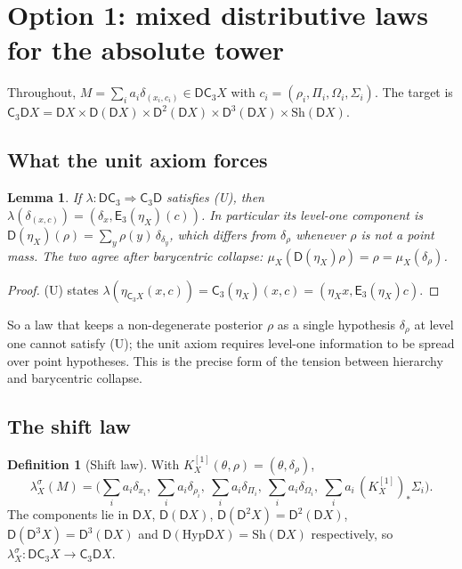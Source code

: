 \documentclass[11pt]{article}
\newtheorem{lemma}[theorem]{Lemma}
\theoremstyle{definition}
\newtheorem{definition}[theorem]{Definition}
\theoremstyle{remark}
\newcommand{\D}{\mathsf{D}}
\newcommand{\Hyp}{\mathrm{Hyp}}
\newcommand{\Sh}{\mathrm{Sh}}
\newcommand{\C}{\mathsf{C}}
\newcommand{\E}{\mathsf{E}}
\newcommand{\ls}{\lambda^{\sigma}}
\begin{document}
\section{Option 1: mixed distributive laws for the absolute tower}\label{sec:laws}

Throughout, $M=\sum_ia_i\delta_{(x_i,c_i)}\in\D\C_3X$ with $c_i=(\rho_i,\Pi_i,\Omega_i,\Sigma_i)$.
The target is $\C_3\D X=\D X\times\D(\D X)\times\D^2(\D X)\times\D^3(\D X)\times\Sh(\D X)$.

\subsection{What the unit axiom forces}

\begin{lemma}\label{lem:unit-forces}
If $\lambda\colon\D\C_3\Rightarrow\C_3\D$ satisfies (U), then
$\lambda(\delta_{(x,c)})=(\delta_x,\E_3(\eta_X)(c))$. In particular its level-one component is
$\D(\eta_X)(\rho)=\sum_y\rho(y)\,\delta_{\delta_y}$, which differs from $\delta_\rho$ whenever $\rho$ is
not a point mass. The two agree after barycentric collapse: $\mu_X(\D(\eta_X)\rho)=\rho=\mu_X(\delta_\rho)$.
\end{lemma}
\begin{proof}
(U) states $\lambda(\eta_{\C_3X}(x,c))=\C_3(\eta_X)(x,c)=(\eta_Xx,\E_3(\eta_X)c)$.
\end{proof}

So a law that keeps a non-degenerate posterior $\rho$ as a single hypothesis $\delta_\rho$ at level one
cannot satisfy (U); the unit axiom requires level-one information to be spread over point
hypotheses. This is the precise form of the tension between hierarchy and barycentric collapse.

\subsection{The shift law}

\begin{definition}[Shift law]
With $K^{[1]}_X(\theta,\rho)=(\theta,\delta_\rho)$,
\[
\ls_X(M)=\Big(\sum_ia_i\delta_{x_i},\ \sum_ia_i\delta_{\rho_i},\ \sum_ia_i\delta_{\Pi_i},\
\sum_ia_i\delta_{\Omega_i},\ \sum_ia_i\,(K^{[1]}_X)_*\Sigma_i\Big).
\]
The components lie in $\D X$, $\D(\D X)$, $\D(\D^2X)=\D^2(\D X)$, $\D(\D^3X)=\D^3(\D X)$ and
$\D(\Hyp\D X)=\Sh(\D X)$ respectively, so $\ls_X\colon\D\C_3X\to\C_3\D X$.
\end{definition}
\end{document}
